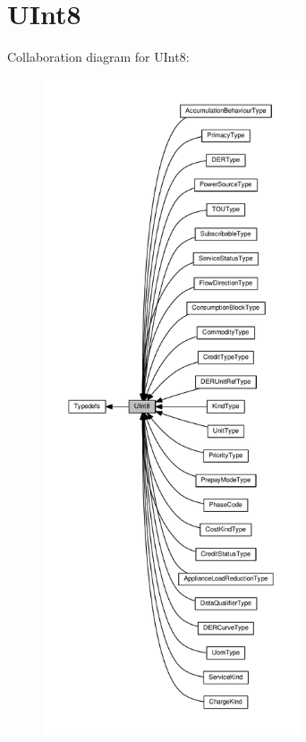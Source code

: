 \hypertarget{group__UInt8}{}\section{U\+Int8}
\label{group__UInt8}
Collaboration diagram for U\+Int8\+:\nopagebreak
\begin{figure}[H]
\begin{center}
\leavevmode
\includegraphics[height=550pt]{group__UInt8}
\end{center}
\end{figure}
